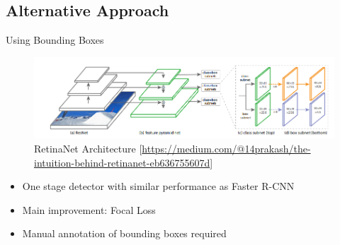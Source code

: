 \documentclass[10pt]{beamer}
\begin{document}
\subsection{Alternative Approach}
\begin{frame}{Using Bounding Boxes}
	\begin{figure}
		\includegraphics[width=\columnwidth]{images/retinanet.png}
		\caption{RetinaNet Architecture [\url{https://medium.com/@14prakash/the-intuition-behind-retinanet-eb636755607d}]}
	\end{figure}

	\begin{itemize}
		\item One stage detector with similar performance as Faster R-CNN
		\item Main improvement: Focal Loss
		\item Manual annotation of bounding boxes required
	\end{itemize}
\end{frame}

\end{document}
